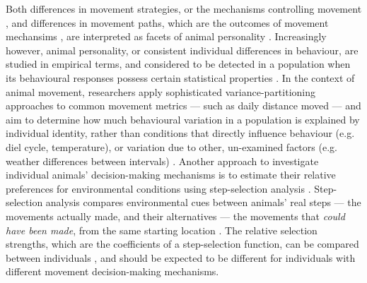     Both differences in movement strategies, or the mechanisms controlling movement \citep{spiegel2017}, and differences in movement paths, which are the outcomes of movement mechansims \citep{abrahms2017,hertel2021}, are interpreted as facets of animal personality \citep{sih2004,sih2004a}.
    Increasingly however, animal personality, or consistent individual differences in behaviour, are studied in empirical terms, and considered to be detected in a population when its behavioural responses possess certain statistical properties \citep{sanchez-tojar2021}.
    In the context of animal movement, researchers apply sophisticated variance-partitioning approaches to common movement metrics --- such as daily distance moved --- and aim to determine how much behavioural variation in a population is explained by individual identity, rather than conditions that directly influence behaviour (e.g. diel cycle, temperature), or variation due to other, un-examined factors (e.g. weather differences between intervals) \citep{hertel2020, hertel2019, hertel2021}.
    Another approach to investigate individual animals' decision-making mechanisms is to estimate their relative preferences for environmental conditions using step-selection analysis \citep[][see also resource selection analysis: \citealt{manly2007}]{fortin2005,thurfjell2014,avgar2016,signer2019,fieberg2021}.
    Step-selection analysis compares environmental cues between animals' real steps --- the movements actually made, and their alternatives --- the movements that \textit{could have been made}, from the same starting location \citep{thurfjell2014,fieberg2021}.
    The relative selection strengths, which are the coefficients of a step-selection function, can be compared between individuals \citep{thurfjell2014}, and should be expected to be different for individuals with different movement decision-making mechanisms.
    
